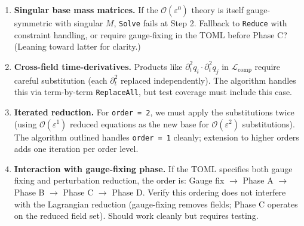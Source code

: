 \begin{enumerate}
  \item \textbf{Singular base mass matrices.} If the $\mathcal{O}(\varepsilon^0)$ theory is itself gauge-symmetric with singular $M$, \texttt{Solve} fails at Step 2. Fallback to \texttt{Reduce} with constraint handling, or require gauge-fixing in the TOML before Phase C? (Leaning toward latter for clarity.)
  \item \textbf{Cross-field time-derivatives.} Products like $\partial_t^2 q_i \cdot \partial_t^2 q_j$ in $\mathcal{L}_{\mathrm{comp}}$ require careful substitution (each $\partial_t^2$ replaced independently). The algorithm handles this via term-by-term \texttt{ReplaceAll}, but test coverage must include this case.
  \item \textbf{Iterated reduction.} For \texttt{order = 2}, we must apply the substitutions twice (using $\mathcal{O}(\varepsilon^1)$ reduced equations as the new base for $\mathcal{O}(\varepsilon^2)$ substitutions). The algorithm outlined handles \texttt{order = 1} cleanly; extension to higher orders adds one iteration per order level.
  \item \textbf{Interaction with gauge-fixing phase.} If the TOML specifies both gauge fixing and perturbation reduction, the order is: Gauge fix $\to$ Phase A $\to$ Phase B $\to$ Phase C $\to$ Phase D. Verify this ordering does not interfere with the Lagrangian reduction (gauge-fixing removes fields; Phase C operates on the reduced field set). Should work cleanly but requires testing.
\end{enumerate}

